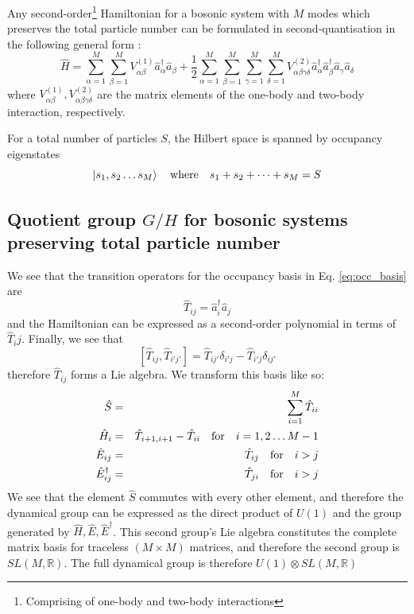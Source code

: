 \documentclass[12pt]{article}
\begin{document}
	Any second-order\footnote{Comprising of one-body and two-body interactions} Hamiltonian for a bosonic system with $M$ modes which preserves the total particle number can be formulated in second-quantisation in the following general form \cite[p. 3]{green}:
	\begin{equation}\label{eq:general hamiltonian}
	\hat{H} = \sum_{\alpha=1}^M\sum_{\beta=1}^M V^{(1)}_{\alpha\beta}\hat{a}^\dagger_\alpha\hat{a}_\beta + \frac{1}{2}\sum_{\alpha=1}^M\sum_{\beta=1}^M\sum_{\gamma=1}^M\sum_{\delta=1}^M V^{(2)}_{\alpha\beta\gamma\delta}\hat{a}^\dagger_\alpha\hat{a}^\dagger_\beta\hat{a}_\gamma\hat{a}_\delta
	\end{equation}
	where $V^{(1)}_{\alpha\beta}, V^{(2)}_{\alpha\beta\gamma\delta}$ are the matrix elements of the one-body and two-body interaction, respectively.
	
	For a total number of particles $S$, the Hilbert space is spanned by occupancy eigenstates
	\begin{equation}\label{eq:occ_basis}
	\ket{s_1,s_2\dots s_M}\qq{where} s_1+s_2+\dots + s_M = S
	\end{equation}
	
	\subsection{Quotient group $G/H$ for bosonic systems preserving total particle number}
	
	We see that the transition operators for the occupancy basis in Eq. \ref{eq:occ_basis} are
	\begin{equation}
		\hat{T}_{ij}=\hat{a}^\dagger_i\hat{a}_j
	\end{equation}
	and the Hamiltonian can be expressed as a second-order polynomial in terms of $\hat{T}_ij$. Finally, we see that
	\begin{equation}
	\left[\hat{T}_{ij}, \hat{T}_{i'j'}\right]=\hat{T}_{ij'}\delta_{i'j}-\hat{T}_{i'j}\delta_{ij'}
	\end{equation}
	therefore $\hat{T}_{ij}$ forms a Lie algebra. We transform this basis like so:
	\begin{eqnarray*}
	\hat{S}&=&\sum_{i=1}^M\hat{T}_{ii}\\
	\hat{H}_i&=&\hat{T}_{i+1,i+1}-\hat{T}_{ii}\qq{for}i=1,2\dots M-1\\
	\hat{E}_{ij}&=&\hat{T}_{ij}\qq{for}i>j\\
	\hat{E}_{ij}^\dagger &=&\hat{T}_{ji}\qq{for}i>j
	\end{eqnarray*}
	We see that the element $\hat{S}$ commutes with every other element, and therefore the dynamical group can be expressed as the direct product of $U(1)$ and the group generated by $\hat{H},\hat{E},\hat{E}^\dagger$. This second group's Lie algebra constitutes the complete matrix basis for traceless $(M\times M)$ matrices, and therefore the second group is $SL(M,\mathbb{R})$. The full dynamical group is therefore $U(1)\otimes SL(M,\mathbb{R})$
	
\end{document}
